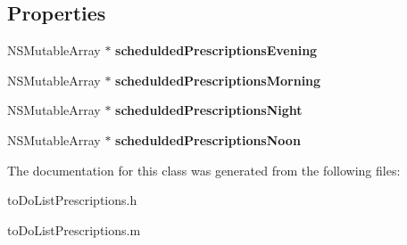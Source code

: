 \subsection*{Properties}
\begin{DoxyCompactItemize}
\item 
\hypertarget{interfaceto_do_list_prescriptions_a325034a18f3e9b690595f5e3c4bae542}{}N\+S\+Mutable\+Array $\ast$ {\bfseries schedulded\+Prescriptions\+Evening}\label{interfaceto_do_list_prescriptions_a325034a18f3e9b690595f5e3c4bae542}

\item 
\hypertarget{interfaceto_do_list_prescriptions_a0f2eb79372afa3b1db8f7210f2073c6d}{}N\+S\+Mutable\+Array $\ast$ {\bfseries schedulded\+Prescriptions\+Morning}\label{interfaceto_do_list_prescriptions_a0f2eb79372afa3b1db8f7210f2073c6d}

\item 
\hypertarget{interfaceto_do_list_prescriptions_a3f9be0b5ffc5a75467236d543a4257ea}{}N\+S\+Mutable\+Array $\ast$ {\bfseries schedulded\+Prescriptions\+Night}\label{interfaceto_do_list_prescriptions_a3f9be0b5ffc5a75467236d543a4257ea}

\item 
\hypertarget{interfaceto_do_list_prescriptions_a16fa74d1d8c729294a2a597f3a3468f7}{}N\+S\+Mutable\+Array $\ast$ {\bfseries schedulded\+Prescriptions\+Noon}\label{interfaceto_do_list_prescriptions_a16fa74d1d8c729294a2a597f3a3468f7}

\end{DoxyCompactItemize}


The documentation for this class was generated from the following files\+:\begin{DoxyCompactItemize}
\item 
to\+Do\+List\+Prescriptions.\+h\item 
to\+Do\+List\+Prescriptions.\+m\end{DoxyCompactItemize}
